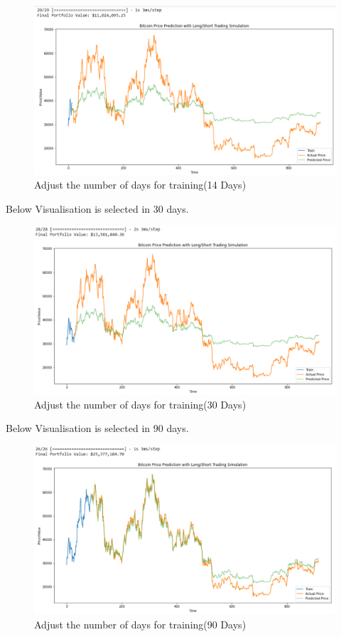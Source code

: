 \begin{figure}[H]
\centering
\includegraphics[scale=0.65]{fig11.jpg}
\caption{Adjust the number of days for training(14 Days)}
\label{Adjust the number of days for training}
\end{figure}

Below Visualisation is selected in 30 days.

\begin{figure}[H]
\centering
\includegraphics[scale=0.65]{fig12.jpg}
\caption{Adjust the number of days for training(30 Days)}
\label{Adjust the number of days for training}
\end{figure}

Below Visualisation is selected in 90 days.

\begin{figure}[H]
\centering
\includegraphics[scale=0.65]{fig13.jpg}
\caption{Adjust the number of days for training(90 Days)}
\label{Adjust the number of days for training}
\end{figure}

